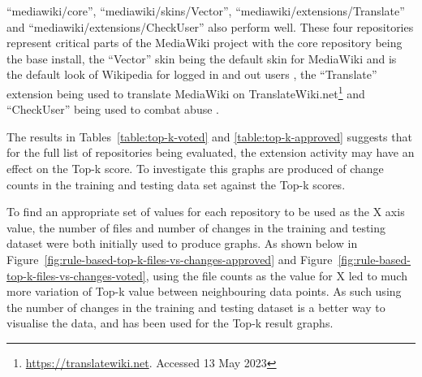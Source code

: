 ``mediawiki/core'', ``mediawiki/skins/Vector'', ``mediawiki/extensions/Translate'' and ``mediawiki/extensions/CheckUser'' also perform well. These four repositories represent critical parts of the MediaWiki project with the core repository being the base install, the ``Vector'' skin being the default skin for MediaWiki and is the default look of Wikipedia for logged in and out users , the ``Translate'' extension being used to translate MediaWiki on TranslateWiki.net\footnote{\url{https://translatewiki.net}. Accessed 13 May 2023}  and ``CheckUser'' being used to combat abuse \citep[p. 158]{10.1145/2030376.2030394}.

The results in Tables~\ref{table:top-k-voted} and \ref{table:top-k-approved} suggests that for the full list of repositories being evaluated, the extension activity may have an effect on the Top-k score. To investigate this graphs are produced of change counts in the training and testing data set against the Top-k scores.

To find an appropriate set of values for each repository to be used as the X axis value, the number of files and number of changes in the training and testing dataset were both initially used to produce graphs. As shown below in Figure~\ref{fig:rule-based-top-k-files-vs-changes-approved} and Figure~\ref{fig:rule-based-top-k-files-vs-changes-voted}, using the file counts as the value for X led to much more variation of Top-k value between neighbouring data points. As such using the number of changes in the training and testing dataset is a better way to visualise the data, and has been used for the Top-k result graphs.

